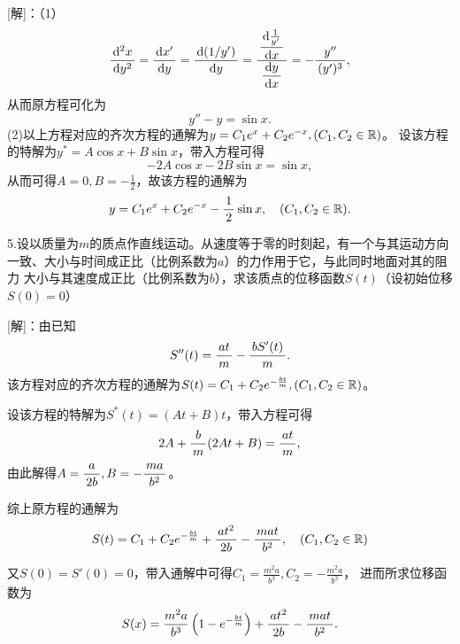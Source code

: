 [解]：（1）
$$\df{\d^2x}{\d y^2}=\df{\d x'}{\d y}
=\df{\d(1/y')}{\d y}=
\df{\df{\d\frac1{y'}}{\d x}}{\df{\d y}{\d x}}=-\df{y''}{(y')^3},$$
从而原方程可化为
$$y''-y=\sin x.$$
(2)以上方程对应的齐次方程的通解为$y=C_1e^x+C_2e^{-x},(C_1,C_2\in\mbb{R})$。
设该方程的特解为$y^*=A\cos x+B\sin x$，带入方程可得
$$-2A\cos x-2B\sin x=\sin x,$$
从而可得$A=0,B=-\frac12$，故该方程的通解为
$$y=C_1e^x+C_2e^{-x}-\df12\sin x,\quad (C_1,C_2\in\mbb{R}).$$
\fin

\bs

5.设以质量为$m$的质点作直线运动。从速度等于零的时刻起，有一个与其运动方向
一致、大小与时间成正比（比例系数为$a$）的力作用于它，与此同时地面对其的阻力
大小与其速度成正比（比例系数为$b$），求该质点的位移函数$S(t)$（设初始位移$S(0)=0$）

[解]：由已知
$$S''(t)=\df{at}m-\df{bS'(t)}m.$$
该方程对应的齐次方程的通解为$S(t)=C_1+C_2e^{-\frac{bt}m},(C_1,C_2\in\mbb{R})$。

设该方程的特解为$S^*(t)=(At+B)t$，带入方程可得
$$2A+\df bm(2At+B)=\df{at}m,$$
由此解得$A=\df{a}{2b},B=-\df{ma}{b^2}$。

综上原方程的通解为
$$S(t)=C_1+C_2e^{-\frac{bt}m}+\df{at^2}{2b}-\df{mat}{b^2},
\quad (C_1,C_2\in\mbb{R})$$

又$S(0)=S'(0)=0$，带入通解中可得$C_1=\frac{m^2a}{b^3},C_2=-\frac{m^2a}{b^3}$，
进而所求位移函数为
$$S(x)=\frac{m^2a}{b^3}\left(1-e^{-\frac{bt}m}\right)
+\df{at^2}{2b}-\df{mat}{b^2}.$$
\fin

